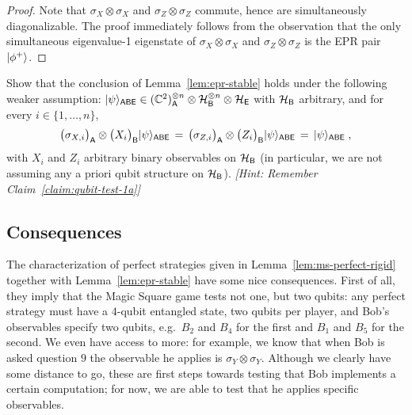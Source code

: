 \begin{proof}
Note that $\sigma_X\otimes \sigma_X$ and $\sigma_Z\otimes \sigma_Z$ commute, hence are simultaneously diagonalizable. 
The proof immediately follows from the observation that the only simultaneous eigenvalue-1 eigenstate of $\sigma_X\otimes \sigma_X$ and $\sigma_Z\otimes \sigma_Z$ is the EPR pair $|\phi^+\rangle$. 
\end{proof}

\begin{exercise}
Show that the conclusion of Lemma~\ref{lem:epr-stable} holds under the following weaker assumption: $|\psi\rangle_{{\textsf{ABE}}} \in (\mathbb{C}^2)_{\textsf{A}}^{\otimes n} \otimes \mathcal{H}_{\textsf{B}}^{\otimes n} \otimes \mathcal{H}_{\textsf{E}}$ with $\mathcal{H}_{\textsf{B}}$ arbitrary, and for every $i\in \{1,\ldots, n\}$,
\[\big(\sigma_{X,i}\big)_{\textsf{A}} \otimes \big(X_i\big)_{\textsf{B}} |\psi\rangle_{{\textsf{ABE}}} \,=\, \big(\sigma_{Z,i}\big)_{\textsf{A}} \otimes \big(Z_i\big)_{\textsf{B}} |\psi\rangle_{{\textsf{ABE}}} \,=\,|\psi\rangle_{\textsf{ABE}}\;,\]
with $X_i$ and $Z_i$ arbitrary binary observables on $\mathcal{H}_{\textsf{B}}$ (in particular, we are not assuming any a priori qubit structure on $\mathcal{H}_{\textsf{B}}$). \emph{[Hint: Remember Claim~\ref{claim:qubit-test-1a}]}
\end{exercise}


\subsection{Consequences} 

The characterization of perfect strategies given in Lemma~\ref{lem:ms-perfect-rigid} together with Lemma~\ref{lem:epr-stable} have some nice consequences. First of all, they imply that the Magic Square game tests not one, but two qubits: any perfect strategy must have a $4$-qubit entangled state, two qubits per player, and Bob's observables specify two qubits, e.g.\ $B_2$ and $B_4$ for the first and $B_1$ and $B_5$ for the second. We even have access to more: for example, we know that when Bob is asked question $9$ the observable he applies is $\sigma_Y \otimes \sigma_Y$. Although we clearly have some distance to go, these are first steps towards testing that Bob implements a certain computation; for now, we are able to test that he applies specific observables. 

